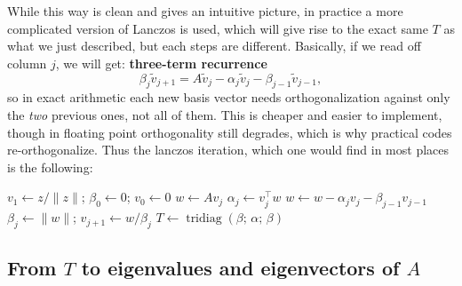 \documentclass[11pt]{article}
\newtheorem*{remarkbox}{Remark}
\begin{document}
While this way is clean and gives an intuitive picture, in practice a more complicated version of Lanczos is used, which will give rise to the exact same $T$ as what we just described, but each steps are different.
Basically, if we read off column $j$, we will get: \textbf{three-term recurrence}
\[
\beta_j \tilde v_{j+1} = A \tilde v_j - \alpha_j \tilde v_j - \beta_{j-1} \tilde v_{j-1},
\]
so in exact arithmetic each new basis vector needs orthogonalization against only the \emph{two} previous ones, not all of them. This is cheaper and easier to implement, though in floating point orthogonality still degrades, which is why practical codes re-orthogonalize. Thus the lanczos iteration, which one would find in most places is the following:

\begin{algorithmic}[1]
\State $v_1 \gets z/\|z\|$; \quad $\beta_0 \gets 0$; \quad $v_0 \gets 0$
  \State $w \gets A v_j$ 
  \State $\alpha_j \gets v_j^\top w$
  \State $w \gets w - \alpha_j v_j - \beta_{j-1} v_{j-1}$
  \State $\beta_j \gets \|w\|$; \quad $v_{j+1} \gets w / \beta_j$
\EndFor
\State $T \gets \operatorname{tridiag}(\beta;\, \alpha;\, \beta)$
\end{algorithmic}


\subsection{From $T$ to eigenvalues and eigenvectors of $A$}
\end{document}
